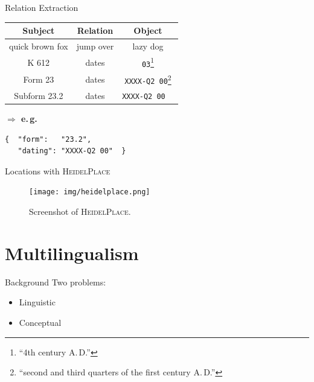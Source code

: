 \documentclass[xcolor=x11names, aspectratio=169,usenames,dvipsnames]{beamer}
\begin{document}
\begin{frame}[fragile]{Relation Extraction}
\begin{center}
\begin{tabularx}{\textwidth}{CCC}
\toprule
\textbf{Subject}&\textbf{Relation}&\textbf{Object}\\\midrule
quick brown fox&jump over&lazy dog\\
K 612&dates&\texttt{03}\footnote{\enquote{4th century A.\,D.}}\\
Form 23&dates&\texttt{XXXX-Q2 00}\footnote{\enquote{second and third quarters of the first century A.\,D.}}\\
Subform 23.2&dates&\texttt{XXXX-Q2 00}~~\\
\bottomrule
\end{tabularx}\bigskip\pause

\begin{minipage}{0.3\textwidth}\flushright
\textbf{$\boldsymbol{\Rightarrow}$ e.\,g.}
\end{minipage}\hfill
\begin{minipage}{0.65\textwidth}
{
\begin{verbatim}
{  "form":   "23.2",
   "dating": "XXXX-Q2 00"  }
\end{verbatim}
}
\end{minipage}
\end{center}
\end{frame}


\begin{frame}{Locations with \textsc{HeidelPlace}}
\begin{figure}
\hspace*{-1em}\texttt{[image: img/heidelplace.png]}
\caption{Screenshot of \textsc{HeidelPlace}.}
\end{figure}
\end{frame}

\section{Multilingualism}

\begin{frame}{Background}
Two problems:
\begin{itemize}
\item Linguistic
\item Conceptual
\end{itemize}
\end{frame}
\end{document}
